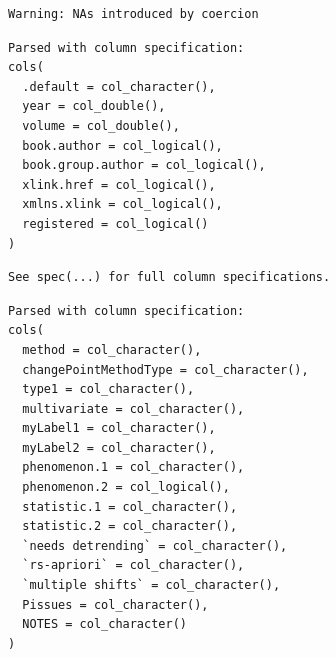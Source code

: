\documentclass[12pt,twoside,openany]{reedthesis}
\begin{document}
\begin{verbatim}
Warning: NAs introduced by coercion
\end{verbatim}
\begin{verbatim}
Parsed with column specification:
cols(
  .default = col_character(),
  year = col_double(),
  volume = col_double(),
  book.author = col_logical(),
  book.group.author = col_logical(),
  xlink.href = col_logical(),
  xmlns.xlink = col_logical(),
  registered = col_logical()
)
\end{verbatim}
\begin{verbatim}
See spec(...) for full column specifications.
\end{verbatim}
\begin{verbatim}
Parsed with column specification:
cols(
  method = col_character(),
  changePointMethodType = col_character(),
  type1 = col_character(),
  multivariate = col_character(),
  myLabel1 = col_character(),
  myLabel2 = col_character(),
  phenomenon.1 = col_character(),
  phenomenon.2 = col_logical(),
  statistic.1 = col_character(),
  statistic.2 = col_character(),
  `needs detrending` = col_character(),
  `rs-apriori` = col_character(),
  `multiple shifts` = col_character(),
  Pissues = col_character(),
  NOTES = col_character()
)
\end{verbatim}
\end{document}
